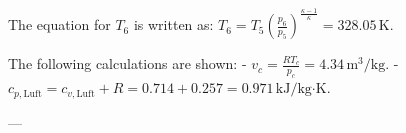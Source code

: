 The equation for \( T_6 \) is written as:  
\( T_6 = T_5 \left( \frac{p_6}{p_5} \right)^{\frac{\kappa - 1}{\kappa}} = 328.05 \, \text{K} \).  

The following calculations are shown:  
- \( v_c = \frac{R T_c}{p_c} = 4.34 \, \text{m}^3/\text{kg} \).  
- \( c_{p,\text{Luft}} = c_{v,\text{Luft}} + R = 0.714 + 0.257 = 0.971 \, \text{kJ}/\text{kg·K} \).  

---